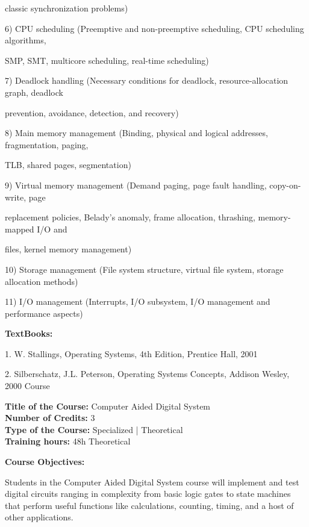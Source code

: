 \documentclass[12pt,a4paper]{article}
\begin{document}
classic synchronization problems)\par
6) CPU scheduling (Preemptive and non-preemptive scheduling, CPU scheduling algorithms,\par
SMP, SMT, multicore scheduling, real-time scheduling)\par
7) Deadlock handling (Necessary conditions for deadlock, resource-allocation graph, deadlock\par
prevention, avoidance, detection, and recovery)\par
8) Main memory management (Binding, physical and logical addresses, fragmentation, paging,\par
TLB, shared pages, segmentation)\par
9) Virtual memory management (Demand paging, page fault handling, copy-on-write, page\par
replacement policies, Belady’s anomaly, frame allocation, thrashing, memory-mapped I/O and\par
files, kernel memory management)\par
10) Storage management (File system structure, virtual file system, storage allocation methods)\par
11) I/O management (Interrupts, I/O subsystem, I/O management and performance aspects)\par\vspace{4pt}
\textbf{TextBooks:}\par\vspace{2pt}
1. W. Stallings, Operating Systems, 4th Edition, Prentice Hall, 2001\par
2. Silberschatz, J.L. Peterson, Operating Systems Concepts, Addison Wesley, 2000 Course\par
\vspace{4pt}

\newpage
\textbf{Title of the Course:} Computer Aided Digital System\\
\textbf{Number of Credits:} 3\\
\textbf{Type of the Course:} Specialized | Theoretical\\
\textbf{Training hours:} 48h Theoretical\par\vspace{4pt}
\textbf{Course Objectives:}\par\vspace{2pt}
Students in the Computer Aided Digital System course will implement and test digital circuits
ranging in complexity from basic logic gates to state machines that perform useful functions like
calculations, counting, timing, and a host of other applications.\par\vspace{4pt}
\end{document}
